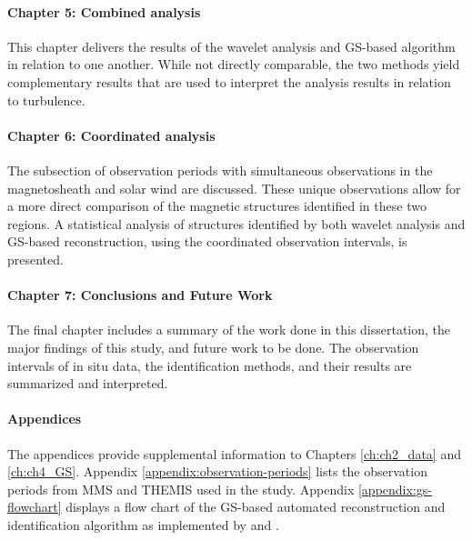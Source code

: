 \paragraph*{Chapter 5: Combined analysis}
This chapter delivers the results of the wavelet analysis and GS-based algorithm in relation to one another. While not directly comparable, the two methods yield complementary results that are used to interpret the analysis results in relation to turbulence.

\paragraph*{Chapter 6: Coordinated analysis}
The subsection of observation periods with simultaneous observations in the magnetosheath and solar wind are discussed. These unique observations allow for a more direct comparison of the magnetic structures identified in these two regions. A statistical analysis of structures identified by both wavelet analysis and GS-based reconstruction, using the coordinated observation intervals, is presented.

\paragraph*{Chapter 7: Conclusions and Future Work}
The final chapter includes a summary of the work done in this dissertation, the major findings of this study, and future work to be done. The observation intervals of in situ data, the identification methods, and their results are summarized and interpreted.

\paragraph*{Appendices}
The appendices provide supplemental information to Chapters \ref{ch:ch2_data} and \ref{ch:ch4_GS}. Appendix \ref{appendix:observation-periods} lists the observation periods from MMS and THEMIS used in the study. Appendix \ref{appendix:gs-flowchart} displays a flow chart of the GS-based automated reconstruction and identification algorithm as implemented by \cite{Hu:2018} and \cite{Zheng:2018}.